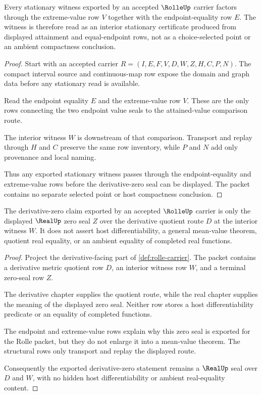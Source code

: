 \begin{theorem}
\label{thm:rolle-extreme-value-stationary-point}
Every stationary witness exported by an accepted $\RolleUp$ carrier factors through the extreme-value row $V$ together with the endpoint-equality row $E$. The witness is therefore read as an interior stationary certificate produced from displayed attainment and equal-endpoint rows, not as a choice-selected point or an ambient compactness conclusion.
\end{theorem}
\begin{proof}
Start with an accepted carrier $R=(I,E,F,V,D,W,Z,H,C,P,N)$. The compact interval source and continuous-map row expose the domain and graph data before any stationary read is available.

Read the endpoint equality $E$ and the extreme-value row $V$. These are the only rows connecting the two endpoint value seals to the attained-value comparison route.

The interior witness $W$ is downstream of that comparison. Transport and replay through $H$ and $C$ preserve the same row inventory, while $P$ and $N$ add only provenance and local naming.

Thus any exported stationary witness passes through the endpoint-equality and extreme-value rows before the derivative-zero seal can be displayed. The packet contains no separate selected point or host compactness conclusion.
\end{proof}

\begin{theorem}
\label{thm:rolle-derivative-zero-seal-boundary}
The derivative-zero claim exported by an accepted $\RolleUp$ carrier is only the displayed $\RealUp$ zero seal $Z$ over the derivative quotient route $D$ at the interior witness $W$. It does not assert host differentiability, a general mean-value theorem, quotient real equality, or an ambient equality of completed real functions.
\end{theorem}
\begin{proof}
Project the derivative-facing part of \autoref{def:rolle-carrier}. The packet contains a derivative metric quotient row $D$, an interior witness row $W$, and a terminal zero-seal row $Z$.

The derivative chapter supplies the quotient route, while the real chapter supplies the meaning of the displayed zero seal. Neither row stores a host differentiability predicate or an equality of completed functions.

The endpoint and extreme-value rows explain why this zero seal is exported for the Rolle packet, but they do not enlarge it into a mean-value theorem. The structural rows only transport and replay the displayed route.

Consequently the exported derivative-zero statement remains a $\RealUp$ seal over $D$ and $W$, with no hidden host differentiability or ambient real-equality content.
\end{proof}

